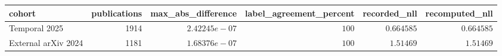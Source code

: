 \begin{tabular}{lrrrrr}
\toprule
cohort & publications & max\_abs\_difference & label\_agreement\_percent & recorded\_nll & recomputed\_nll \\
\midrule
Temporal 2025 & 1914 & $2.42245e-07$ & $100$ & $0.664585$ & $0.664585$ \\
External arXiv 2024 & 1181 & $1.68376e-07$ & $100$ & $1.51469$ & $1.51469$ \\
\bottomrule
\end{tabular}
